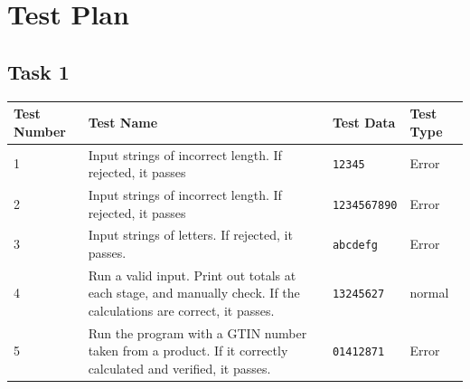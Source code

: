 \documentclass[a4paper]{article}
\begin{document}
\pagebreak

\section{Test Plan}

\subsection{Task 1}
\begin{center}
\begin{tabular}{ | m{4em} | m{19em} | m{7em} | m{10em} | }
  \hline
  Test Number & Test Name & Test Data & Test Type	\\ [0.5ex] 
  \hline\hline
  1 & Input strings of incorrect length. If rejected, it passes & \verb|12345| & Error \\
  \hline 
  2 & Input strings of incorrect length. If rejected, it passes & \verb|1234567890| & Error \\
  \hline 
  3 & Input strings of letters. If rejected, it passes. & \verb|abcdefg| & Error \\
  \hline 
  4 & Run a valid input. Print out totals at each stage, and manually check. If the calculations are correct, it passes. & \verb|13245627| & normal \\
  \hline 
  5 & Run the program with a GTIN number taken from a product. If it correctly calculated and verified, it passes.
 & \verb|01412871| & Error \\
  \hline
\end{tabular}
\end{center}
\end{document}
